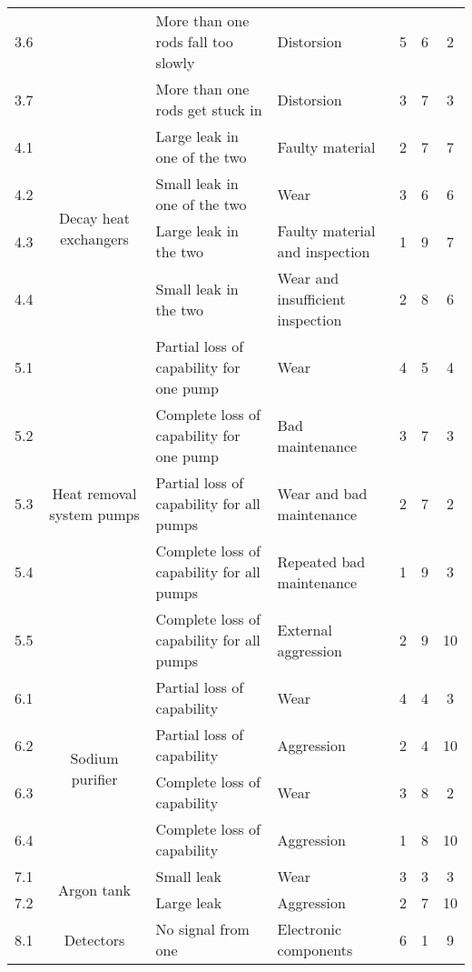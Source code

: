 \begin{longtable}{ccp{4cm}p{4cm}ccc}
    3.6 &                               & More than one rods fall too slowly & Distorsion & 5 & 6 & 2 \\
    3.7 &                               & More than one rods get stuck in & Distorsion & 3 & 7 & 3 \\ \hline
    4.1 & \multirow{4}{3cm}{Decay heat exchangers} & Large leak in one of the two & Faulty material & 2 & 7 & 7 \\
    4.2 &                               & Small leak in one of the two & Wear & 3 & 6 & 6 \\
    4.3 &                               & Large leak in the two & Faulty material and inspection & 1 & 9 & 7 \\
    4.4 &                               & Small leak in the two & Wear and insufficient inspection & 2 & 8 & 6 \\ \hline
    5.1 & \multirow{5}{3cm}{Heat removal system pumps}  & Partial loss of capability for one pump & Wear & 4 & 5 & 4 \\
    5.2 &                                & Complete loss of capability for one pump & Bad maintenance & 3 & 7 & 3 \\
    5.3 &                                & Partial loss of capability for all pumps & Wear and bad maintenance & 2 & 7 & 2 \\
    5.4 &                                & Complete loss of capability for all pumps & Repeated bad maintenance & 1 & 9 & 3 \\
    5.5 &                                & Complete loss of capability for all pumps & External aggression & 2 & 9 & 10 \\ \hline
    6.1 & \multirow{4}{3cm}{Sodium purifier}  & Partial loss of capability & Wear & 4 & 4 & 3 \\
    6.2 &                                & Partial loss of capability & Aggression & 2 & 4 & 10 \\
    6.3 &                                & Complete loss of capability & Wear & 3 & 8 & 2 \\
    6.4 &                                & Complete loss of capability & Aggression & 1 & 8 & 10 \\ \hline
    7.1 & \multirow{2}{3cm}{Argon tank}  & Small leak & Wear & 3 & 3 & 3 \\
    7.2 &                                & Large leak & Aggression & 2 & 7 & 10 \\ \hline
    8.1 & \multirow{4}{3cm}{Detectors}  & No signal from one & Electronic components & 6 & 1 & 9 \\

\end{longtable}
